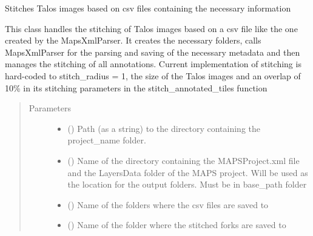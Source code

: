 \documentclass[letterpaper,10pt,english]{sphinxmanual}
\begin{document}
\label{\detokenize{index:module-stitch_MAPS_annotations}}

\begin{fulllineitems}
\label{\detokenize{index:stitch_MAPS_annotations.Stitcher}}
Stitches Talos images based on csv files containing the necessary information

This class handles the stitching of Talos images based on a csv file like the one created by the MapsXmlParser.
It creates the necessary folders, calls MapsXmlParser for the parsing and saving of the necessary metadata and then
manages the stitching of all annotations. Current implementation of stitching is hard-coded to stitch\_radius = 1,
the size of the Talos images and an overlap of 10\% in its stitching parameters in the stitch\_annotated\_tiles
function
\begin{quote}\begin{description}
\item[{Parameters}] \leavevmode\begin{itemize}
\item {} 
 () \textendash{} Path (as a string) to the directory containing the project\_name folder.

\item {} 
 () \textendash{} Name of the directory containing the MAPSProject.xml file and the LayersData
folder of the MAPS project. Will be used as the location for the output folders. Must be in base\_path folder

\item {} 
 () \textendash{} Name of the folders where the csv files are saved to

\item {} 
 () \textendash{} Name of the folder where the stitched forks are saved to


\end{itemize}
\end{description}
\end{quote}
\end{fulllineitems}
\end{document}
